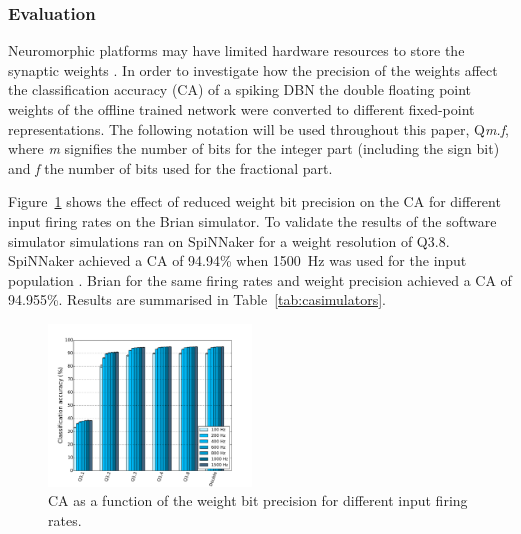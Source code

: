 \subsubsection{Evaluation}


Neuromorphic platforms may have limited hardware resources to store the synaptic weights \citep{Schemmel_etal10,Merolla08082014}. In order to investigate how the precision of the weights affect the classification accuracy (CA) of a spiking DBN the double floating point weights of the offline trained network were converted to different fixed-point representations. The following notation will be used throughout this paper, Q\textit{m.f}, where \textit{m} signifies the number of bits for the integer part (including the sign bit) and \textit{f} the number of bits used for the fractional part.

Figure~\ref{Fig:brianCAfiringrate} shows the effect of reduced weight bit precision on the CA for different input firing rates on the Brian simulator. To validate the results of the software simulator simulations ran on SpiNNaker for a weight resolution of Q3.8. SpiNNaker achieved a CA of 94.94\% when 1500~Hz was used for the input population \citep{SpinnakerDBN2015,iscasSpinnakerAcceptedDemo}. Brian for the same firing rates and weight precision achieved a CA of 94.955\%. Results are summarised in Table~\ref{tab:casimulators}.   

\begin{figure}[hbt!]
	\centering
	\includegraphics[width=0.48\textwidth]{images/evan/cavsfiringrate.pdf}
	\caption{CA as a function of the weight bit precision for different input firing rates.}
	\label{Fig:brianCAfiringrate}
\end{figure} 


